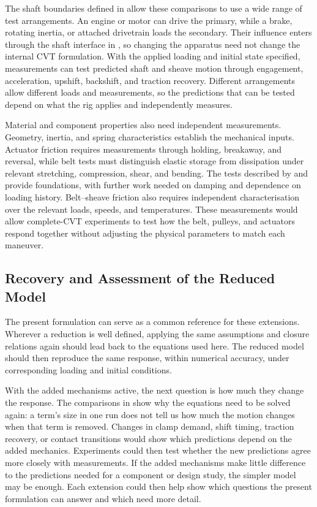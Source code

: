 \documentclass[11pt]{report}
\numberwithin{equation}{section}
\newcounter{assump}
\begin{document}
The shaft boundaries defined in  allow these
comparisons to use a wide range of test arrangements. An engine or motor can
drive the primary, while a brake, rotating inertia, or attached drivetrain
loads the secondary. Their influence enters through the shaft interface in
, so changing the apparatus need not change
the internal CVT formulation. With the applied loading and initial state
specified, measurements can test predicted shaft and sheave motion through
engagement, acceleration, upshift, backshift, and traction recovery. Different
arrangements allow different loads and measurements, so the predictions that
can be tested depend on what the rig applies and independently measures.

Material and component properties also need independent measurements.
Geometry, inertia, and spring characteristics establish the mechanical inputs.
Actuator friction requires measurements through holding, breakaway, and
reversal, while belt tests must distinguish elastic storage from dissipation
under relevant stretching, compression, shear, and bending. The tests
described by \citet{Ballew2015} and \citet{Messick2018} provide foundations,
with further work needed on damping and dependence on loading history.
Belt--sheave friction also requires independent characterisation over the
relevant loads, speeds, and temperatures. These
measurements would allow complete-CVT experiments to test how the belt,
pulleys, and actuators respond together without adjusting the physical
parameters to match each maneuver.

\subsection*{Recovery and Assessment of the Reduced Model}
\label{sec:future_work_reductions_design}

The present formulation can serve as a common reference for these extensions.
Wherever a reduction is well defined, applying the same assumptions and
closure relations again should lead back to the equations used here. The
reduced model should then reproduce the same response, within numerical
accuracy, under corresponding loading and initial conditions.

With the added mechanisms active, the next question is how much they change
the response. The comparisons in 
show why the equations need to be solved again: a term's size in one run does
not tell us how much the motion changes when that term is removed. Changes in
clamp demand, shift timing, traction recovery, or contact transitions would
show which predictions depend on the added mechanics. Experiments could then
test whether the new predictions agree more closely with measurements. If the
added mechanisms make little difference to the predictions needed for a
component or design study, the simpler model may be enough. Each extension
could then help show which questions the present formulation can answer and
which need more detail.
\end{document}
